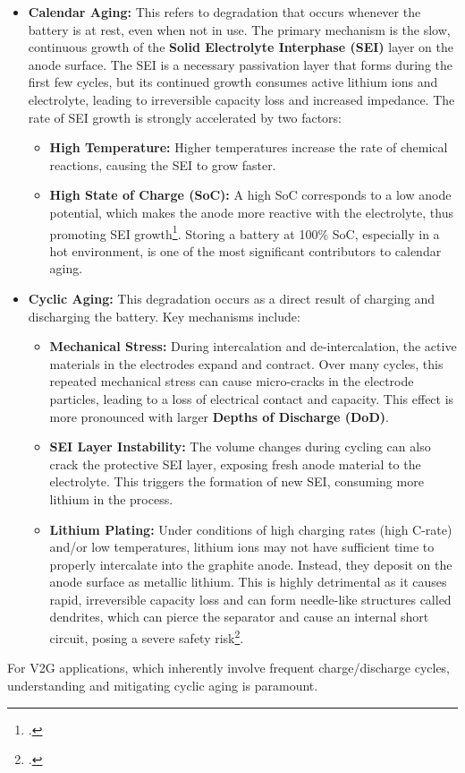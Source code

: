 \begin{itemize}
    \item \textbf{Calendar Aging:} This refers to degradation that occurs whenever the battery is at rest, even when not in use. The primary mechanism is the slow, continuous growth of the \textbf{Solid Electrolyte Interphase (SEI)} layer on the anode surface. The SEI is a necessary passivation layer that forms during the first few cycles, but its continued growth consumes active lithium ions and electrolyte, leading to irreversible capacity loss and increased impedance. The rate of SEI growth is strongly accelerated by two factors:
    \begin{itemize}
        \item \textbf{High Temperature:} Higher temperatures increase the rate of chemical reactions, causing the SEI to grow faster.
        \item \textbf{High State of Charge (SoC):} A high SoC corresponds to a low anode potential, which makes the anode more reactive with the electrolyte, thus promoting SEI growth\footcite{vetter2005ageing}. Storing a battery at 100\% SoC, especially in a hot environment, is one of the most significant contributors to calendar aging.
    \end{itemize}

    \item \textbf{Cyclic Aging:} This degradation occurs as a direct result of charging and discharging the battery. Key mechanisms include:
    \begin{itemize}
        \item \textbf{Mechanical Stress:} During intercalation and de-intercalation, the active materials in the electrodes expand and contract. Over many cycles, this repeated mechanical stress can cause micro-cracks in the electrode particles, leading to a loss of electrical contact and capacity. This effect is more pronounced with larger \textbf{Depths of Discharge (DoD)}.
        \item \textbf{SEI Layer Instability:} The volume changes during cycling can also crack the protective SEI layer, exposing fresh anode material to the electrolyte. This triggers the formation of new SEI, consuming more lithium in the process.
        \item \textbf{Lithium Plating:} Under conditions of high charging rates (high C-rate) and/or low temperatures, lithium ions may not have sufficient time to properly intercalate into the graphite anode. Instead, they deposit on the anode surface as metallic lithium. This is highly detrimental as it causes rapid, irreversible capacity loss and can form needle-like structures called dendrites, which can pierce the separator and cause an internal short circuit, posing a severe safety risk\footcite{birkl2017degradation}.
    \end{itemize}
\end{itemize}
For V2G applications, which inherently involve frequent charge/discharge cycles, understanding and mitigating cyclic aging is paramount.

